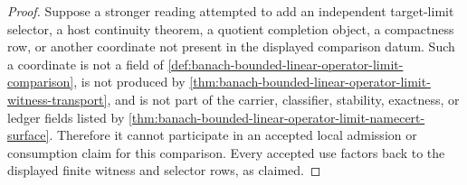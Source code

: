 \begin{proof}
Suppose a stronger reading attempted to add an independent target-limit
selector, a host continuity theorem, a quotient completion object, a compactness
row, or another coordinate not present in the displayed comparison datum. Such
a coordinate is not a field of
\autoref{def:banach-bounded-linear-operator-limit-comparison}, is not produced
by \autoref{thm:banach-bounded-linear-operator-limit-witness-transport}, and
is not part of the carrier, classifier, stability, exactness, or ledger fields
listed by \autoref{thm:banach-bounded-linear-operator-limit-namecert-surface}.
Therefore it cannot participate in an accepted local admission or consumption
claim for this comparison. Every accepted use factors back to the displayed
finite witness and selector rows, as claimed.
\end{proof}

